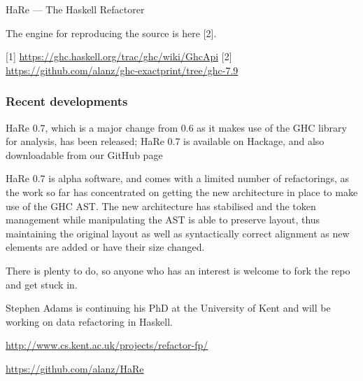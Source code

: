 \begin{hcarentry}[updated]{HaRe --- The Haskell Refactorer}
\begin{compactitem}
\end{compactitem}

The engine for reproducing the source is here [2].

[1] \url{https://ghc.haskell.org/trac/ghc/wiki/GhcApi}
[2] \url{https://github.com/alanz/ghc-exactprint/tree/ghc-7.9}

\subsubsection*{Recent developments}
\begin{compactitem}

\item HaRe 0.7, which is a major change from 0.6 as it makes use of
  the GHC library for analysis, has been released; HaRe 0.7 is
  available on Hackage, and also downloadable from our GitHub page

\item HaRe 0.7 is alpha software, and comes with a limited number of
  refactorings, as the work so far has concentrated on getting the new
  architecture in place to make use of the GHC AST. The new
  architecture has stabilised and the token management while
  manipulating the AST is able to preserve layout, thus maintaining
  the original layout as well as syntactically correct alignment as
  new elements are added or have their size changed.

\item There is plenty to do, so anyone who has an interest is welcome
  to fork the repo and get stuck in.
\item Stephen Adams is continuing his PhD at the University of Kent and
  will be working on data refactoring in Haskell.
\end{compactitem}

\FurtherReading
\begin{compactitem}
\item \url{http://www.cs.kent.ac.uk/projects/refactor-fp/}
\item \url{https://github.com/alanz/HaRe}
\end{compactitem}
\end{hcarentry}
